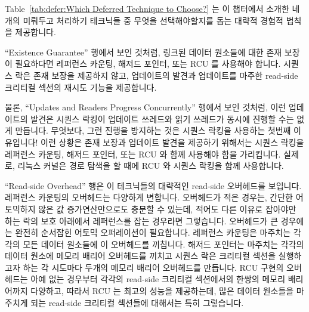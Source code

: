 Table~\ref{tab:defer:Which Deferred Technique to Choose?}
는 이 챕터에서 소개한 네개의 미뤄두고 처리하기 테크닉들 중 무엇을
선택해야할지를 돕는 대략적 경험적 법칙을 제공합니다.

``Existence Guarantee'' 행에서 보인 것처럼, 링크된 데이터 원소들에 대한 존재
보장이 필요하다면 레퍼런스 카운팅, 해저드 포인터, 또는 RCU 를 사용해야 합니다.
시퀀스 락은 존재 보장을 제공하지 않고, 업데이트의 발견과 업데이트를 마주한
read-side 크리티컬 섹션의 재시도 기능을 제공합니다.
\iffalse

Table~\ref{tab:defer:Which Deferred Technique to Choose?}
provides some rough rules of thumb that can help you choose among the
four deferred-processing techniques presented in this chapter.

As shown in the ``Existence Guarantee'' column,
if you need existence guarantees for linked
data elements, you must use reference counting, hazard pointers, or RCU.
Sequence locks do not provide existence guarantees, instead providing
detection of updates, retrying any read-side critical sections
that do encounter an update.
\fi

물론, ``Updates and Readers Progress Concurrently'' 행에서 보인 것처럼, 이런
업데이트의 발견은 시퀀스 락킹이 업데이트 쓰레드와 읽기 쓰레드가 동시에 진행할
수는 없게 만듭니다.
무엇보다, 그런 진행을 방지하는 것은 시퀀스 락킹을 사용하는 첫번째 이유입니다!
이런 상황은 존재 보장과 업데이트 발견을 제공하기 위해서는 시퀀스 락킹을
레퍼런스 카운팅, 해저드 포인터, 또는 RCU 와 함께 사용해야 함을 가리킵니다.
실제로, 리눅스 커널은 경로 탐색을 할 때에 RCU 와 시퀀스 락킹을 함께 사용합니다.
\iffalse

Of course, as shown in the ``Updates and Readers Progress Concurrently''
column, this detection of updates implies
that sequence locking does not permit updaters and readers to make forward
progress concurrently.
After all, preventing such forward progress is the whole point of using
sequence locking in the first place!
This situation points the way to using sequence locking in conjunction
with reference counting, hazard pointers, or RCU in order to provide
both existence guarantees and update detection.
In fact, the Linux kernel combines RCU and sequence locking in
this manner during pathname lookup.
\fi

``Read-side Overhead'' 행은 이 테크닉들의 대략적인 read-side 오버헤드를
보입니다.
레퍼런스 카운팅의 오버헤드는 다양하게 변합니다.
오버헤드가 적은 경우는, 간단한 어토믹하지 않은 값 증가연산만으로도 충분할 수
있는데, 적어도 다른 이유로 잡아야만 하는 락의 보호 아래에서 레퍼런스를 잡는
경우라면 그렇습니다.
오버헤드가 큰 경우에는 완전히 순서잡힌 어토믹 오퍼레이션이 필요합니다.
레퍼런스 카운팅은 마주치는 각각의 모든 데이터 원소들에 이 오버헤드를 끼칩니다.
해저드 포인터는 마주치는 각각의 데이터 원소에 메모리 배리어 오버헤드를 끼치고
시퀀스 락은 크리티컬 섹션을 실행하고자 하는 각 시도마다 두개의 메모리 배리어
오버헤드를 만듭니다.
RCU 구현의 오버헤드는 아예 없는 경우부터 각각의 read-side 크리티컬 섹션에서의
한쌍의 메모리 배리어까지 다양하고, 따라서 RCU 는 최고의 성능을 제공하는데, 많은
데이터 원소들을 마주치게 되는 read-side 크리티컬 섹션들에 대해서는 특히
그렇습니다.
\iffalse

